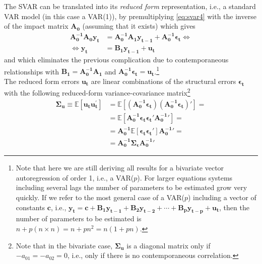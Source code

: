 \documentclass[a4paper,11pt,listof=nochaptergap,oneside,pointednumbers,bibtotoc,bigheadings,liststotoc]{scrbook}
\newcommand{\vect}[1]{\boldsymbol{\mathbf{#1}}}
\begin{document}
The SVAR can be translated into its \textit{reduced form} representation, i.e., a standard VAR model (in this case a VAR(1)), by premultiplying \ref{eq:svar4} with the inverse of the impact matrix $\vect{A_0}$ (assuming that it exists) which gives
\begin{equation} \label{eq:svar5}
\begin{split}
	          \vect{A_0^{-1}}\vect{A_0}\vect{y_t} & = \vect{A_0^{-1}}\vect{A_1}\vect{y_{t-1}} + \vect{A_0^{-1}}\vect{\epsilon_t}     \iff \\
	\iff 						\vect{y_t} & = \vect{B_1}\vect{y_{t-1}} + \vect{u_t}
\end{split}								
\end{equation}
and which eliminates the previous complication due to contemporaneous relationships with $\vect{B_1} = \vect{A_0^{-1}}\vect{A_1}$ and $\vect{A_0^{-1}}\vect{\epsilon_t} = \vect{u_t}$.\footnote{Note that here we are still deriving all results for a bivariate vector autoregression of order 1, i.e., a VAR($p$). For larger equations systems including several lags the number of parameters to be estimated grow very quickly. If we refer to the most general case of a VAR($p$) including a vector of constants $\vect{c}$, i.e., $\vect{y_t} = \vect{c} + \vect{B_1}\vect{y_{t-1}} + \vect{B_2}\vect{y_{t-2}} + \cdots + \vect{B_p}\vect{y_{t-p}} + \vect{u_t}$, then the number of parameters to be estimated is $n + p(n \times n) = n + pn^2 = n(1+pn)$.}\\
The reduced form errors $\vect{u_t}$ are linear combinations of the structural errors $\vect{\epsilon_t}$ with the following reduced-form variance-covariance matrix\footnote{Note that in the bivariate case, $\vect{\Sigma_u}$ is a diagonal matrix only if $-a_{01} = -a_{02} = 0$, i.e., only if there is no contemporaneous correlation.}
\begin{equation} \label{eq:svar6}
\begin{split}
 		\vect{\Sigma_u} \equiv \mathbb{E}[\vect{u_t}\vect{u_t^'}] & = \mathbb{E}[(\vect{A_0^{-1}}\vect{\epsilon_t}) (\vect{A_0^{-1}}\vect{\epsilon_t})' ] = \\
								& = \mathbb{E}[\vect{A_0^{-1}}\vect{\epsilon_t} \vect{\epsilon_t}'\vect{A_0^{-1}}'] = \\
								& = \vect{A_0^{-1}}\mathbb{E}[\vect{\epsilon_t} \vect{\epsilon_t}']\vect{A_0^{-1}}' = \\
								& = \vect{A_0^{-1}}\vect{\Sigma_\epsilon}\vect{A_0^{-1}}'
\end{split}								
\end{equation}
\end{document}
